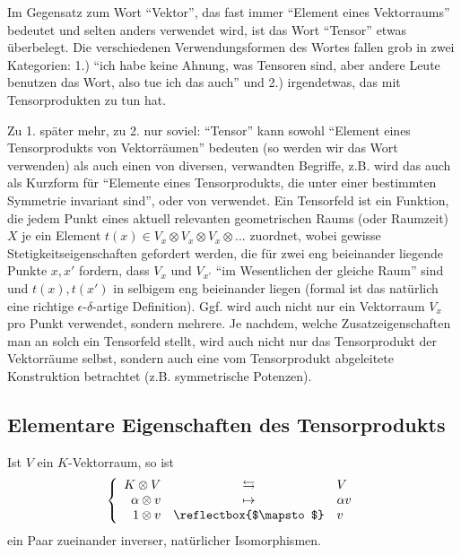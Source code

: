 \begin{remark}
Im Gegensatz zum Wort \enquote{Vektor}, das fast immer \enquote{Element eines Vektorraums} bedeutet und selten anders verwendet wird, ist das Wort \enquote{Tensor} etwas überbelegt. Die verschiedenen Verwendungsformen des Wortes fallen grob in zwei Kategorien: 1.) \enquote{ich habe keine Ahnung, was Tensoren sind, aber andere Leute benutzen das Wort, also tue ich das auch} und 2.) irgendetwas, das mit Tensorprodukten zu tun hat.

\smallbreak
Zu 1. später mehr, zu 2. nur soviel: \enquote{Tensor} kann sowohl \enquote{Element eines Tensorprodukts von Vektorräumen} bedeuten (so werden wir das Wort verwenden) als auch einen von diversen, verwandten Begriffe, z.B. wird das auch als Kurzform für \enquote{Elemente eines Tensorprodukts, die unter einer bestimmten Symmetrie invariant sind}, oder von  verwendet. Ein Tensorfeld ist ein Funktion, die jedem Punkt eines aktuell relevanten geometrischen Raums (oder Raumzeit) $X$ je ein Element $t(x)\in V_x\otimes V_x \otimes V_x \otimes ... $ zuordnet, wobei gewisse Stetigkeitseigenschaften gefordert werden, die für zwei eng beieinander liegende Punkte $x,x'$ fordern, dass $V_x$ und $V_{x'}$ \enquote{im Wesentlichen der gleiche Raum} sind und $t(x),t(x')$ in selbigem eng beieinander liegen (formal ist das natürlich eine richtige $\epsilon$-$\delta$-artige Definition). Ggf. wird auch nicht nur ein Vektorraum $V_x$ pro Punkt verwendet, sondern mehrere. Je nachdem, welche Zusatzeigenschaften man an solch ein Tensorfeld stellt, wird auch nicht nur das Tensorprodukt der Vektorräume selbst, sondern auch eine vom Tensorprodukt abgeleitete Konstruktion betrachtet (z.B. symmetrische Potenzen).
\end{remark}

\subsection{Elementare Eigenschaften des Tensorprodukts}

\begin{lemma}[{$K\otimes V = V$}]
Ist $V$ ein $K$-Vektorraum, so ist
\[\left\{\begin{array}{rcl}
K\otimes V & \leftrightarrows & V \\
\alpha\otimes v & \mapsto & \alpha v \\
1\otimes v & \reflectbox{$\mapsto$} & v
\end{array}\right.\]
ein Paar zueinander inverser, natürlicher Isomorphismen.
\end{lemma}

